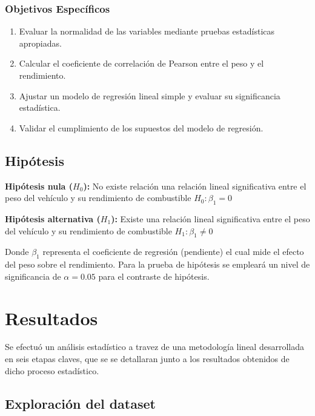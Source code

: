 \documentclass[12pt, letterpaper]{article}
\begin{document}
    \subsubsection{Objetivos Específicos}
    
    \begin{enumerate}
        \item Evaluar la normalidad de las variables mediante pruebas estadísticas
            apropiadas.

        \item Calcular el coeficiente de correlación de Pearson entre el  peso y el rendimiento.

        \item Ajustar un modelo de regresión lineal simple y evaluar su significancia
            estadística.

        \item Validar el cumplimiento de los supuestos del modelo de regresión.

    \end{enumerate}

    \subsection{Hipótesis}

    \textbf{Hipótesis nula ($H_{0}$):} No existe relación una relación lineal significativa entre
    el peso del vehículo y su rendimiento de combustible $H_0: \beta_{1} = 0$

    \textbf{Hipótesis alternativa ($H_{1}$):} Existe una relación lineal significativa
    entre el peso del vehículo y su rendimiento de combustible $H_1: \beta_{1} \neq 0$

    Donde $\beta_{1}$ representa el coeficiente de regresión (pendiente) el cual mide el efecto del peso sobre el rendimiento. Para la prueba de hipótesis se empleará  un nivel de significancia de 
    $\alpha = 0.05$ para el contraste de hipótesis.

    \section{Resultados}

    Se efectuó un análisis estadístico a travez de una metodología lineal desarrollada en seis etapas claves, que se se detallaran junto a los resultados obtenidos de dicho proceso estadístico.
    
    \subsection{Exploración del dataset}
\end{document}
